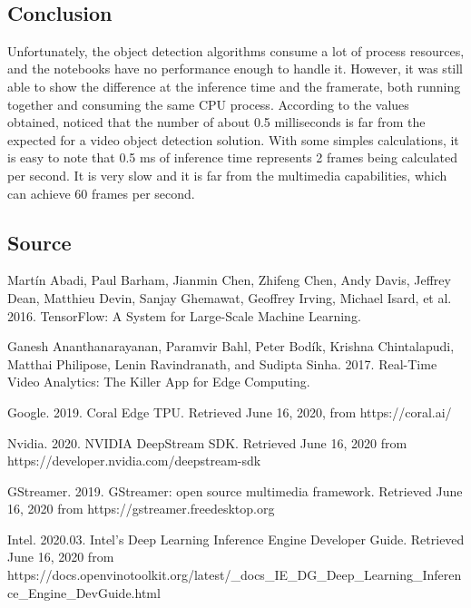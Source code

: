 \documentclass[11pt]{article}
\begin{document}
    \begin{center}
    \end{center}
    { \hspace*{\fill} \\}
    
    \subsection{Conclusion}\label{conclusion}

Unfortunately, the object detection algorithms consume a lot of process
resources, and the notebooks have no performance enough to handle it.
However, it was still able to show the difference at the inference time
and the framerate, both running together and consuming the same CPU
process. According to the values obtained, noticed that the number of
about 0.5 milliseconds is far from the expected for a video object
detection solution. With some simples calculations, it is easy to note
that 0.5 ms of inference time represents 2 frames being calculated per
second. It is very slow and it is far from the multimedia capabilities,
which can achieve 60 frames per second.

    \subsection{Source}\label{source}

Martín Abadi, Paul Barham, Jianmin Chen, Zhifeng Chen, Andy Davis,
Jeffrey Dean, Matthieu Devin, Sanjay Ghemawat, Geoffrey Irving, Michael
Isard, et al. 2016. TensorFlow: A System for Large-Scale Machine
Learning.

Ganesh Ananthanarayanan, Paramvir Bahl, Peter Bodík, Krishna
Chintalapudi, Matthai Philipose, Lenin Ravindranath, and Sudipta Sinha.
2017. Real-Time Video Analytics: The Killer App for Edge Computing.

Google. 2019. Coral Edge TPU. Retrieved June 16, 2020, from
https://coral.ai/

Nvidia. 2020. NVIDIA DeepStream SDK. Retrieved June 16, 2020 from
https://developer.nvidia.com/deepstream-sdk

GStreamer. 2019. GStreamer: open source multimedia framework. Retrieved
June 16, 2020 from https://gstreamer.freedesktop.org

Intel. 2020.03. Intel's Deep Learning Inference Engine Developer Guide.
Retrieved June 16, 2020 from
https://docs.openvinotoolkit.org/latest/\_docs\_IE\_DG\_Deep\_Learning\_Inference\_Engine\_DevGuide.html


    
    
    
\end{document}
